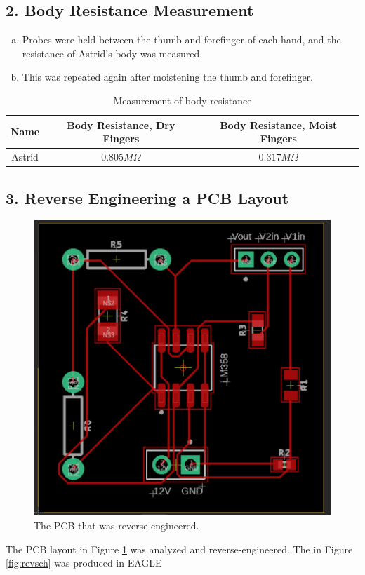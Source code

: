 \documentclass[12pt]{article}
\begin{document}
\subsection*{2. Body Resistance Measurement}
\begin{enumerate}[a)]
    \item Probes were held between the thumb and forefinger of each hand, and the 
        resistance of Astrid's body was measured.
    \item This was repeated again after moistening the thumb and forefinger.
\end{enumerate}
\begin{table}[ht]
    \caption{Measurement of body resistance}
    \label{tbl:bodyres}
    \centering
    \begin{tabular}{| c | c | c |}
        \hline
        Name & Body Resistance, Dry Fingers & Body Resistance, Moist Fingers \\
        \hline
        Astrid & $0.805 M\Omega$ & $0.317 M\Omega$ \\
        \hline
    \end{tabular} 
\end{table}

\subsection*{3. Reverse Engineering a PCB Layout}

\begin{figure}[H]
    \centering
        \includegraphics[width=0.5\linewidth]{pcb.png}
    \caption{The PCB that was reverse engineered.}
    \label{fig:revengpcb}
\end{figure} 

The PCB layout in Figure \ref{fig:revengpcb} was analyzed and reverse-engineered. The 
in Figure \ref{fig:revsch} was produced in EAGLE 
\end{document}
